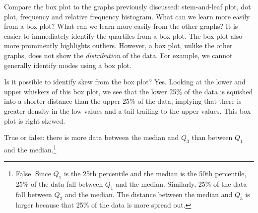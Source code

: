 \begin{example}{Compare the box plot to the graphs previously discussed: stem-and-leaf plot, dot plot, frequency and relative frequency histogram. What can we learn more easily from a box plot? What can we learn more easily from the other graphs?}
It is easier to immediately identify the quartiles from a box plot. The box plot also more prominently highlights outliers. However, a box plot, unlike the other graphs, does not show the \emph{distribution} of the data. For example, we cannot generally identify modes using a box plot.
\end{example}

\begin{example}
{Is it possible to identify skew from the box plot?} Yes. Looking at the lower and upper whiskers of this box plot, we see that the lower 25\% of the data is squished into a shorter distance than the upper 25\% of the data, implying that there is greater density in the low values and a tail trailing to the upper values. This box plot is right skewed.
\end{example}

\begin{exercise}
True or false: there is more data between the median and $Q_3$ than between $Q_1$ and the median.\footnote{False. Since $Q_1$ is the 25th percentile and the median is the 50th percentile, 25\% of the data fall between $Q_1$ and the median. Similarly, 25\% of the data fall between $Q_2$ and the median. The distance between the median and $Q_3$ is larger because that 25\% of the data is more spread out.}
\end{exercise}





